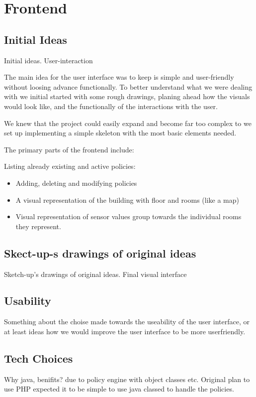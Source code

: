\section{Frontend}
\subsection{Initial Ideas}
Initial ideas. User-interaction

The main idea for the user interface was to keep is simple and user-friendly without loosing advance functionally. To better understand what we were dealing with we initial started with some rough drawings, planing ahead how the visuals would look like, and the functionally of the interactions with the user.

We knew that the project could easily expand and become far too complex to we set up implementing a simple skeleton with the most basic elements needed.

The primary parts of the frontend include:

Listing already existing and active policies:
\begin{itemize}
\item Adding, deleting and modifying policies
\item A visual representation of the building with floor and rooms (like a map)
\item Visual representation of sensor values group towards the individual rooms they represent.
\end{itemize}



\subsection{Skect-up-s drawings of original ideas}

	Sketch-up's drawings of original ideas.
	Final visual interface
	

\subsection{Usability}
Something about the choise made towards the useability of the user interface, or at least ideas how we would improve the user interface to be more userfriendly.


\subsection{Tech Choices}
Why java, benifits? due to policy engine with object classes etc. Original plan to use PHP expected it to be simple to use java classed to handle the policies.
